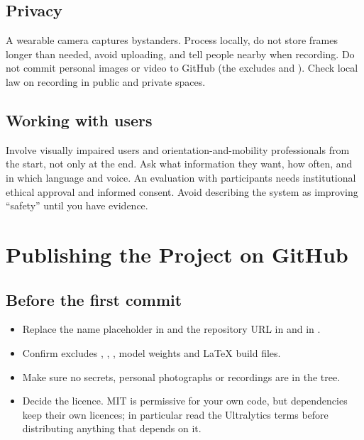 \section{Privacy}
A wearable camera captures bystanders. Process locally, do not store frames longer than needed, avoid uploading, and tell people nearby when recording. Do not commit personal images or video to GitHub (the  excludes  and ). Check local law on recording in public and private spaces.

\section{Working with users}
Involve visually impaired users and orientation-and-mobility professionals from the start, not only at the end. Ask what information they want, how often, and in which language and voice. An evaluation with participants needs institutional ethical approval and informed consent. Avoid describing the system as improving ``safety'' until you have evidence.

\chapter{Publishing the Project on GitHub}
\section{Before the first commit}
\begin{itemize}
  \item Replace the name placeholder in  and the repository URL in  and in .
  \item Confirm  excludes , , , model weights and LaTeX build files.
  \item Make sure no secrets, personal photographs or recordings are in the tree.
  \item Decide the licence. MIT is permissive for your own code, but dependencies keep their own licences; in particular read the Ultralytics terms before distributing anything that depends on it.
\end{itemize}

